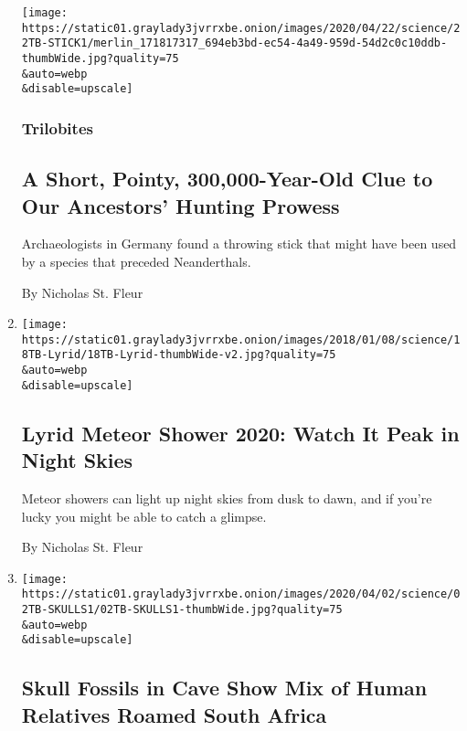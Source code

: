 \begin{enumerate}
  \texttt{[image: https://static01.graylady3jvrrxbe.onion/images/2020/04/22/science/22TB-STICK1/merlin\_171817317\_694eb3bd-ec54-4a49-959d-54d2c0c10ddb-thumbWide.jpg?quality=75\\\&auto=webp\\\&disable=upscale]}

  \hypertarget{trilobites}{%
  \subsubsection{Trilobites}\label{trilobites}}

  \hypertarget{a-short-pointy-300000-year-old-clue-to-our-ancestors-hunting-prowess}{%
  \subsection{A Short, Pointy, 300,000-Year-Old Clue to Our Ancestors'
  Hunting
  Prowess}\label{a-short-pointy-300000-year-old-clue-to-our-ancestors-hunting-prowess}}

  Archaeologists in Germany found a throwing stick that might have been
  used by a species that preceded Neanderthals.

  By Nicholas St. Fleur
\item
  \href{/2020/04/21/science/lyrids-meteor-shower.html}{}

  \texttt{[image: https://static01.graylady3jvrrxbe.onion/images/2018/01/08/science/18TB-Lyrid/18TB-Lyrid-thumbWide-v2.jpg?quality=75\\\&auto=webp\\\&disable=upscale]}

  \hypertarget{lyrid-meteor-shower-2020-watch-it-peak-in-night-skies}{%
  \subsection{Lyrid Meteor Shower 2020: Watch It Peak in Night
  Skies}\label{lyrid-meteor-shower-2020-watch-it-peak-in-night-skies}}

  Meteor showers can light up night skies from dusk to dawn, and if
  you're lucky you might be able to catch a glimpse.

  By Nicholas St. Fleur
\item
  \href{/2020/04/02/science/skulls-africa-caves.html}{}

  \texttt{[image: https://static01.graylady3jvrrxbe.onion/images/2020/04/02/science/02TB-SKULLS1/02TB-SKULLS1-thumbWide.jpg?quality=75\\\&auto=webp\\\&disable=upscale]}

  \hypertarget{skull-fossils-in-cave-show-mix-of-human-relatives-roamed-south-africa}{%
  \subsection{Skull Fossils in Cave Show Mix of Human Relatives Roamed
  South
  Africa}\label{skull-fossils-in-cave-show-mix-of-human-relatives-roamed-south-africa}}


\end{enumerate}
